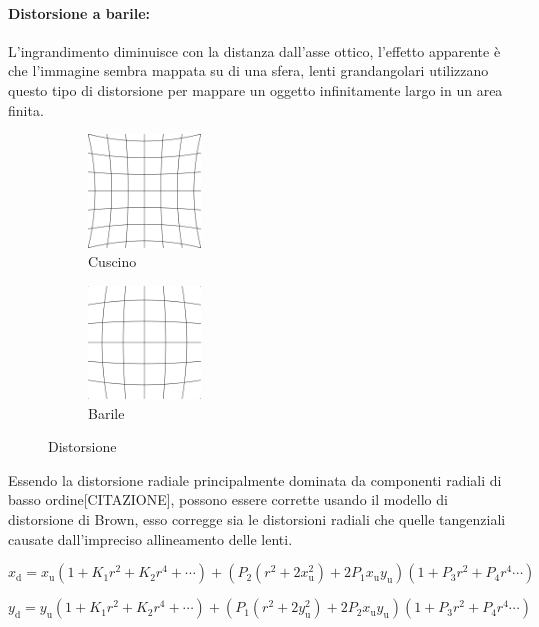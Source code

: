 \paragraph{Distorsione a barile:}
L'ingrandimento diminuisce con la distanza dall'asse ottico, l'effetto apparente è che l'immagine sembra mappata su di una sfera, lenti grandangolari utilizzano questo tipo di distorsione per mappare un oggetto infinitamente largo in un area finita.
\begin{figure}[!h]
\begin{subfigure}[b]{.5\textwidth}
\centering
\includegraphics[height=3cm]{img/distorsione-cuscino.pdf}
\caption{Cuscino}\label{fig:distorsione-cuscino}
\end{subfigure}
\begin{subfigure}[b]{.5\textwidth}
\centering
\includegraphics[height=3cm]{img/distorsione-barile.pdf}
\caption{Barile}\label{fig:distorsione-barile}
\end{subfigure}
\caption{Distorsione}
\label{fig:distorsione}
\end{figure}

Essendo la distorsione radiale principalmente dominata da componenti radiali di basso ordine[CITAZIONE], possono essere corrette usando il modello di distorsione di Brown, esso corregge sia le distorsioni radiali che quelle tangenziali causate dall'impreciso allineamento delle lenti.

\[
 x_\mathrm{d} = x_\mathrm{u}(1 + K_1r^2 + K_2r^4 + \cdots) + 
(P_2(r^2 + 2x_\mathrm{u}^2) + 2P_1 x_\mathrm{u}y_\mathrm{u})(1 + P_3r^2 + P_4r^4 \cdots) \]

\[y_\mathrm{d} = y_\mathrm{u}(1 + K_1r^2 + K_2r^4 + \cdots) + 
(P_1(r^2 + 2y_\mathrm{u}^2) + 2P_2 x_\mathrm{u}y_\mathrm{u})(1 + P_3r^2 + P_4r^4 \cdots)
\]

